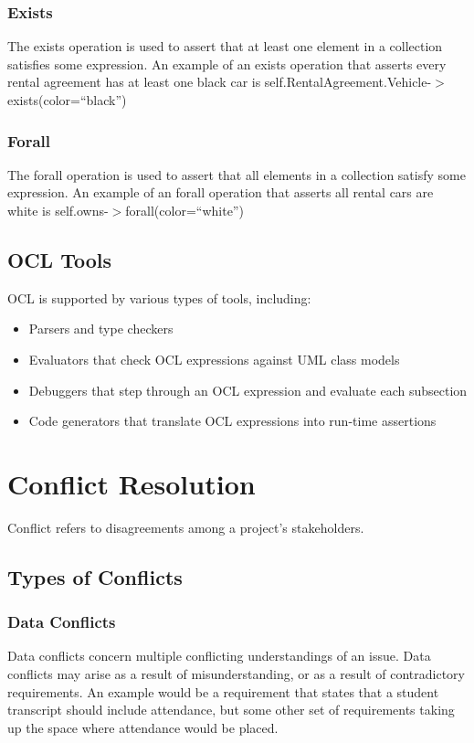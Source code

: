 \documentclass[12pt,titlepage]{article}
\begin{document}
      \subsubsection{Exists}
        The exists operation is used to assert that at least one element in a collection satisfies some expression. An example of an exists
        operation that asserts every rental agreement has at least one black car is self.RentalAgreement.Vehicle-$>$exists(color=``black'')

      \subsubsection{Forall}
        The forall operation is used to assert that all elements in a collection satisfy some expression. An example of an forall operation
        that asserts all rental cars are white is self.owns-$>$forall(color=``white'')

    \subsection{OCL Tools}
      OCL is supported by various types of tools, including:
      \begin{itemize}
        \item Parsers and type checkers
        \item Evaluators that check OCL expressions against UML class models
        \item Debuggers that step through an OCL expression and evaluate each subsection
        \item Code generators that translate OCL expressions into run-time assertions
      \end{itemize}

  \newpage

  \section{Conflict Resolution}
    Conflict refers to disagreements among a project's stakeholders.

    \subsection{Types of Conflicts}

      \subsubsection{Data Conflicts}
        Data conflicts concern multiple conflicting understandings of an issue. Data conflicts may arise as a result of misunderstanding, or
        as a result of contradictory requirements. An example would be a requirement that states that a student transcript should
        include attendance, but some other set of requirements taking up the space where attendance would be placed.
\end{document}
